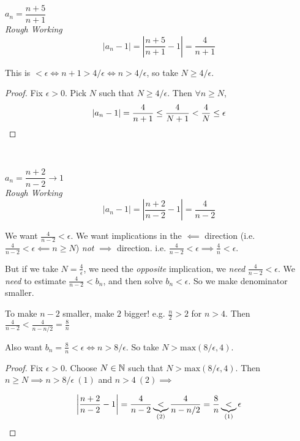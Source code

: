 \begin{example}
$a_n = \dfrac{n+5}{n+1}$\\

\emph{Rough Working}
\[ |a_n - 1| = \left| \dfrac{n+5}{n+1} -1 \right| = \dfrac{4}{n+1}\]

This is $< \epsilon \iff n+1 > 4/\epsilon \iff n > 4/\epsilon$, so take $N \geq 4/\epsilon$. 

\begin{proof}
Fix $\epsilon > 0$. Pick $N$ such that $N \geq 4/\epsilon$. Then $\forall n \geq N$, \[|a_n - 1| = \frac{4}{n+1} \leq \frac{4}{N+1} < \frac{4}{N} \leq \epsilon\qedhere\]
\end{proof}
\end{example}~

\begin{example}$a_n = \dfrac{n+2}{n-2} \to 1$\\

\emph{Rough Working} 
\[|a_n -1| = \left|\frac{n+2}{n-2} - 1\right| = \frac{4}{n-2}\]

We want $\frac{4}{n-2} < \epsilon$. We want implications in the $\impliedby$ direction (i.e. $\frac{4}{n-2} < \epsilon \impliedby n \geq N$) \emph{not} $\implies$ direction. i.e. $\frac{4}{n-2} < \epsilon \implies \frac{4}{n} < \epsilon$.

But if we take $N = \frac{4}{\epsilon}$, we need the \emph{opposite} implication, we \emph{need} $\frac{4}{n-2} < \epsilon$. We \emph{need} to estimate $\frac{4}{n-2} < b_n$, and then solve $b_n < \epsilon$. So we make denominator smaller. 

To make $n-2$ smaller, make $2$ bigger! e.g. $\frac{n}{2}>2$ for $n>4$. Then $\frac{4}{n-2} < \frac{4}{n-n/2} = \frac{8}{n}$

Also want $b_n = \frac{8}{n} < \epsilon \iff n > 8/\epsilon$. So take $N > \mathrm{max}(8/\epsilon, 4)$.

\begin{proof}
Fix $\epsilon > 0.$	Choose $N \in\mathbb{N}$ such that $N > \mathrm{max}(8/\epsilon, 4)$. Then $n \geq N \implies n > 8/\epsilon~ (1)$ and $n > 4 ~(2) \implies$

\[\left|\frac{n+2}{n-2} - 1\right| = \frac{4}{n-2} \underbrace{<}_{(2)} \frac{4}{n-n/2} = \frac{8}{n} \underbrace{<}_{(1)} \epsilon\qedhere\]

\end{proof}

	
\end{example}
\pagebreak


